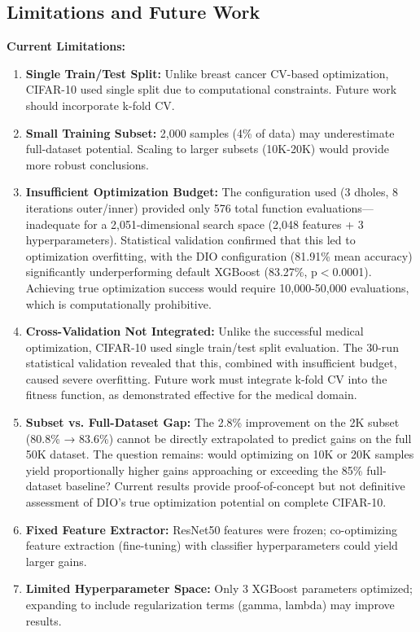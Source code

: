 \documentclass[12pt, a4paper]{article}
\begin{document}
\subsection{Limitations and Future Work}

\textbf{Current Limitations:}
\begin{enumerate}
    \item \textbf{Single Train/Test Split:} Unlike breast cancer CV-based optimization, CIFAR-10 used single split due to computational constraints. Future work should incorporate k-fold CV.
    
    \item \textbf{Small Training Subset:} 2,000 samples (4\% of data) may underestimate full-dataset potential. Scaling to larger subsets (10K-20K) would provide more robust conclusions.
    
    \item \textbf{Insufficient Optimization Budget:} The configuration used (3 dholes, 8 iterations outer/inner) provided only 576 total function evaluations—inadequate for a 2,051-dimensional search space (2,048 features + 3 hyperparameters). Statistical validation confirmed that this led to optimization overfitting, with the DIO configuration (81.91\% mean accuracy) significantly underperforming default XGBoost (83.27\%, p$<$0.0001). Achieving true optimization success would require 10,000-50,000 evaluations, which is computationally prohibitive.
    
    \item \textbf{Cross-Validation Not Integrated:} Unlike the successful medical optimization, CIFAR-10 used single train/test split evaluation. The 30-run statistical validation revealed that this, combined with insufficient budget, caused severe overfitting. Future work must integrate k-fold CV into the fitness function, as demonstrated effective for the medical domain.
    
    \item \textbf{Subset vs. Full-Dataset Gap:} The 2.8\% improvement on the 2K subset (80.8\% → 83.6\%) cannot be directly extrapolated to predict gains on the full 50K dataset. The question remains: would optimizing on 10K or 20K samples yield proportionally higher gains approaching or exceeding the 85\% full-dataset baseline? Current results provide proof-of-concept but not definitive assessment of DIO's true optimization potential on complete CIFAR-10.
    
    \item \textbf{Fixed Feature Extractor:} ResNet50 features were frozen; co-optimizing feature extraction (fine-tuning) with classifier hyperparameters could yield larger gains.
    
    \item \textbf{Limited Hyperparameter Space:} Only 3 XGBoost parameters optimized; expanding to include regularization terms (gamma, lambda) may improve results.
\end{enumerate}
\end{document}
